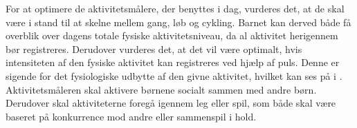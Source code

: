 For at optimere de aktivitetsmålere, der benyttes i dag, vurderes det, at de skal være i stand til at skelne mellem gang, løb og cykling. Barnet kan derved både få overblik over dagens totale fysiske aktivitetsniveau, da al aktivitet herigennem bør registreres. %
Derudover vurderes det, at det vil være optimalt, hvis intensiteten af den fysiske aktivitet kan registreres ved hjælp af puls. Denne er sigende for det fysiologiske udbytte af den givne aktivitet, hvilket kan ses på  i .\newline
Aktivitetsmåleren skal aktivere børnene socialt sammen med andre børn. Derudover skal aktiviteterne foregå igennem leg eller spil, som både skal være baseret på konkurrence mod andre eller sammenspil i hold. \vspace{2cm}